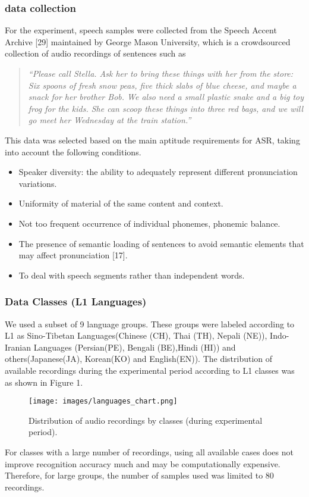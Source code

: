 \documentclass[ams]{U-AizuGT}
\begin{document}
\subsubsection{data collection}
For the experiment, speech samples were collected from the Speech Accent Archive [29] maintained by George Mason University, which is a crowdsourced collection of audio recordings of sentences such as
\begin{quotation}{\it “Please call Stella. Ask her to bring these things with her from the store: Six spoons of fresh snow peas, five thick slabs of blue cheese, and maybe a snack for her brother Bob. We also need a small plastic snake and a big toy frog for the kids. She can scoop these things into three red bags, and we will go meet her Wednesday at the train station.”}
\end{quotation}
This data was selected based on the main aptitude requirements for ASR, taking into account the following conditions.
\begin{itemize}
\item {Speaker diversity: the ability to adequately represent different pronunciation variations.}
\item {Uniformity of material of the same content and context.}
\item {Not too frequent occurrence of individual phonemes, phonemic balance.}
\item {The presence of semantic loading of sentences to avoid semantic elements that may affect pronunciation [17].}
\item {To deal with speech segments rather than independent words.}
\end{itemize}


\subsubsection{Data Classes (L1 Languages)}
We used a subset of 9 language groups. These groups were labeled according to L1 as Sino-Tibetan Languages(Chinese (CH), Thai (TH), Nepali (NE)), Indo-Iranian Languages (Persian(PE), Bengali (BE),Hindi (HI)) and others(Japanese(JA), Korean(KO) and English(EN)). The distribution of available recordings during the experimental period according to L1 classes was as shown in Figure 1.
\begin{figure}[h]
    \centering
    \texttt{[image: images/languages\_chart.png]}
    \caption{Distribution of audio recordings by classes (during experimental period).}
    
\end{figure}
For classes with a large number of recordings, using all available cases does not improve recognition accuracy much and may be computationally expensive. Therefore, for large groups, the number of samples used was limited to 80 recordings.
\end{document}
